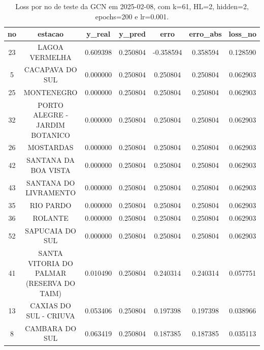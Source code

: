\begin{table}[h]
\centering
\caption{Loss por no de teste da GCN em 2025-02-08, com k=61, HL=2, hidden=2, epochs=200 e lr=0.001.}
\label{tab:gcn_loss_k61_hl2_h2_e200_d20250208}
\begin{tabular}{ccccccc}
\toprule
no & estacao & y\_real & y\_pred & erro & erro\_abs & loss\_no \\
\midrule
23 & LAGOA VERMELHA & 0.609398 & 0.250804 & -0.358594 & 0.358594 & 0.128590 \\
5 & CACAPAVA DO SUL & 0.000000 & 0.250804 & 0.250804 & 0.250804 & 0.062903 \\
25 & MONTENEGRO & 0.000000 & 0.250804 & 0.250804 & 0.250804 & 0.062903 \\
32 & PORTO ALEGRE - JARDIM BOTANICO & 0.000000 & 0.250804 & 0.250804 & 0.250804 & 0.062903 \\
26 & MOSTARDAS & 0.000000 & 0.250804 & 0.250804 & 0.250804 & 0.062903 \\
42 & SANTANA DA BOA VISTA & 0.000000 & 0.250804 & 0.250804 & 0.250804 & 0.062903 \\
43 & SANTANA DO LIVRAMENTO & 0.000000 & 0.250804 & 0.250804 & 0.250804 & 0.062903 \\
35 & RIO PARDO & 0.000000 & 0.250804 & 0.250804 & 0.250804 & 0.062903 \\
36 & ROLANTE & 0.000000 & 0.250804 & 0.250804 & 0.250804 & 0.062903 \\
52 & SAPUCAIA DO SUL & 0.000000 & 0.250804 & 0.250804 & 0.250804 & 0.062903 \\
41 & SANTA VITORIA DO PALMAR (RESERVA DO TAIM) & 0.010490 & 0.250804 & 0.240314 & 0.240314 & 0.057751 \\
13 & CAXIAS DO SUL - CRIUVA & 0.053406 & 0.250804 & 0.197398 & 0.197398 & 0.038966 \\
8 & CAMBARA DO SUL & 0.063419 & 0.250804 & 0.187385 & 0.187385 & 0.035113 \\
\bottomrule
\end{tabular}
\end{table}
